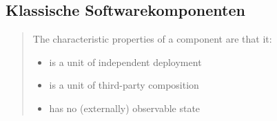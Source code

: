 \subsection{Klassische Softwarekomponenten}
\label{sec:2_Softwarekomponente_Klassisch}
\begin{quote}
\glqq The characteristic properties of a component are that it: \citereset \autocite[siehe][S. 35-38]{Szyperski.2002}\grqq
\begin{itemize}
\item is a unit of independent deployment
\item is a unit of third-party composition
\item has no (externally) observable state
\end{itemize}
\end{quote}

